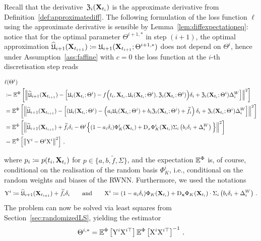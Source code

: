 Recall that the derivative~$\mathfrak{Z}_{i}(\mathbf{X}_{t_i})$ is the approximate derivative from Definition~\ref{def:approximatediff}. The following formulation of the loss function $\ell$ using the approximate derivative is sensible by Lemma~\ref{lem:diffexpectationeq}: notice that for the optimal parameter $\Theta^{i+1, *}$ in step $(i+1)$, the optimal approximation $\widehat {\mathfrak{U}}_{i+1}(\mathbf{X}_{t_{i+1}})\coloneqq\mathfrak{U}_{i+1}(\mathbf{X}_{t_{i+1}}; \Theta^{i+1, *})$ 
does not depend on $\Theta^i$, hence under Assumption~\ref{ass:faffine} with $c=0$ the loss function at the $i$-th discretisation step reads
\begin{small}
\begin{align*}
    &\ell(\Theta^i) \\
    &\coloneqq \mathbb{E}^\Phi\left[\left\| \widehat {\mathfrak{U}}_{i+1}(\mathbf{X}_{t_{i+1}}) - \left[\mathfrak{U}_i(\mathbf{X}_{t_i};\Theta^i) - f\Big(t_{i}, \mathbf{X}_{t_{i}}, \mathfrak{U}_i(\mathbf{X}_{t_i};\Theta^i), \mathfrak{Z}_{i}(\mathbf{X}_{t_i}; \Theta^i)\Big)\delta_{i} + \mathfrak{Z}_{i}(\mathbf{X}_{t_i}; \Theta^i)\Delta^{W}_{i}\right] \right\|^2\right] \\
    &= \mathbb{E}^\Phi\left[\left\| \widehat {\mathfrak{U}}_{i+1}(\mathbf{X}_{t_{i+1}}) - \left[(\mathfrak{U}_i(\mathbf{X}_{t_i};\Theta^i) - \left(a_{i}\mathfrak{U}_i(\mathbf{X}_{t_i};\Theta^i) + b_{i}\mathfrak{Z}_{i}(\mathbf{X}_{t_i}; \Theta^i) + \widetilde{f}_{i}\right)\delta_{i} + \mathfrak{Z}_{i}(\mathbf{X}_{t_i}; \Theta^i)\Delta^{W}_{i}\right] \right\|^2\right] \\
    &= \mathbb{E}^\Phi\left[\left\| \widehat {\mathfrak{U}}_{i+1}(\mathbf{X}_{t_{i+1}}) + \widetilde{f}_{i}\delta_{i} - \Theta^i\Big\{(1-a_{i}\delta_{i})\Phi_K^i(\mathbf{X}_{t_i}) + \mathrm{D}_{x} \Phi_K^i(\mathbf{X}_{t_i}) \Sigma_i \left(b_{i}\delta_{i}  + \Delta^{W}_{i}\right)\Big\} \right\|^2\right] \\
    &= \mathbb{E}^\Phi\left[\left\| \mathrm{Y}^i - \Theta^i \mathrm{X}^i \right\|^2\right]\,,
\end{align*}
\end{small}%
where $p_{i} \coloneqq p(t_i, \mathbf{X}_{t_i})$ for $p \in \{a, b, \widetilde{f}, \Sigma\}$, and the expectation $\mathbb{E}^\Phi$ is, of course, conditional on the realisation of the random basis $\Phi_K^i$, i.e., conditional on the random weights and biases of the RWNN. Furthermore, we used the notations
\[
\mathrm{Y}^i \coloneqq \widehat {\mathfrak{U}}_{i+1}(\mathbf{X}_{t_{i+1}}) + \widetilde{f}_{i}\delta_{i}
    \qquad\text{and}\qquad
\mathrm{X}^i \coloneqq 
(1-a_{i}\delta_{i})\Phi_K(\mathbf{X}_{t_i}) + \mathrm{D}_{\boldsymbol{\mathrm{x}}}\Phi_K(\mathbf{X}_{t_i})\cdot \Sigma_i \left(b_{i}\delta_{i}  + \Delta^{W}_{i}\right)\,.
\]
The problem can now be solved via least squares from Section~\ref{sec:randomizedLS}, yielding the estimator
$$
\Theta^{i,*} = \mathbb{E}^\Phi\left[\mathrm{Y}^i\mathrm{X}^{i\top}\right]
\mathbb{E}^\Phi\left[\mathrm{X}^i\mathrm{X}^{i\top}\right]^{-1}\,.
$$

